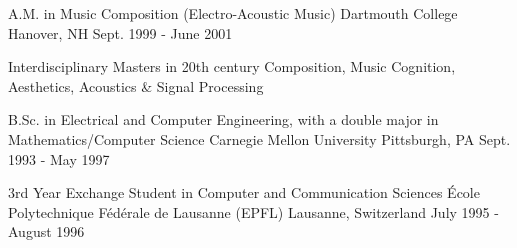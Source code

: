 

\begin{cventries}

  \cventry
    {A.M. in Music Composition (Electro-Acoustic Music)} %
    {Dartmouth College} %
    {Hanover, NH} %
    {Sept. 1999 - June 2001} %
    {
      \begin{cvitems} %
        \item {Interdisciplinary Masters in 20th century Composition, Music Cognition, Aesthetics, Acoustics \& Signal Processing}
      \end{cvitems}
    }

  \cventry
    {B.Sc. in Electrical and Computer Engineering, with a double major in Mathematics/Computer Science} %
    {Carnegie Mellon University} %
    {Pittsburgh, PA} %
    {Sept. 1993 - May 1997} %
    {
      \begin{cvitems} %
      \end{cvitems}
    }
    
  \cventry
    {3rd Year Exchange Student in Computer and Communication Sciences} %
    {{\'E}cole Polytechnique F{\'e}d{\'e}rale de Lausanne (EPFL)} %
    {Lausanne, Switzerland} %
    {July 1995 - August 1996} %
    {
      \begin{cvitems} %
      \end{cvitems}
    }
    
\end{cventries}

